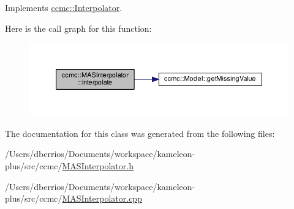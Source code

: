 Implements \hyperlink{classccmc_1_1_interpolator_aa6b272bd53630020d92938ec1e5cfad9}{ccmc\-::\-Interpolator}.



Here is the call graph for this function\-:
\nopagebreak
\begin{figure}[H]
\begin{center}
\leavevmode
\includegraphics[width=350pt]{classccmc_1_1_m_a_s_interpolator_ab4015bfd559e1eac116ef1772be91b03_cgraph}
\end{center}
\end{figure}




The documentation for this class was generated from the following files\-:\begin{DoxyCompactItemize}
\item 
/\-Users/dberrios/\-Documents/workspace/kameleon-\/plus/src/ccmc/\hyperlink{_m_a_s_interpolator_8h}{M\-A\-S\-Interpolator.\-h}\item 
/\-Users/dberrios/\-Documents/workspace/kameleon-\/plus/src/ccmc/\hyperlink{_m_a_s_interpolator_8cpp}{M\-A\-S\-Interpolator.\-cpp}\end{DoxyCompactItemize}
